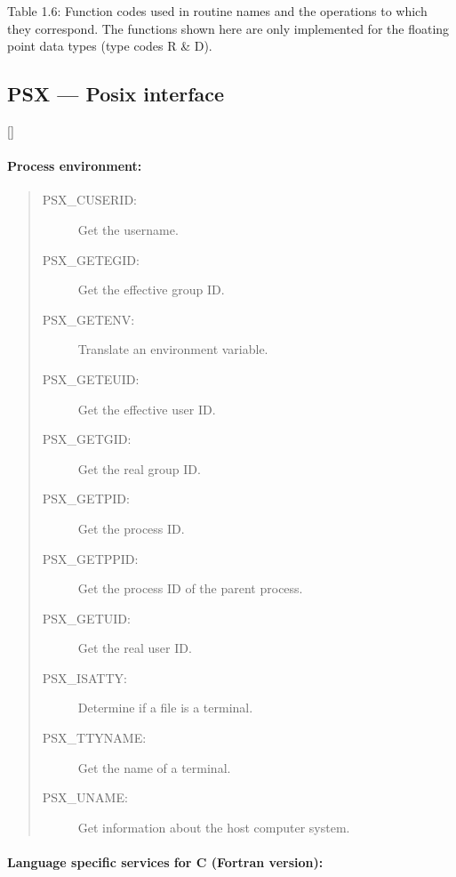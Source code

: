Table 1.6: Function codes used in routine names and the operations to which they
correspond.
The functions shown here are only implemented for the floating point data types
(type codes R \& D).

\newpage

\subsection{PSX --- Posix interface}

\vspace{-9mm}

\hfill []

\vspace{2mm}

\paragraph{Process environment:} \hfill

\begin{quote}
\begin{description}
\item [PSX\_CUSERID:]  Get the username.
\item [PSX\_GETEGID:]  Get the effective group ID.
\item [PSX\_GETENV:]  Translate an environment variable.
\item [PSX\_GETEUID:]  Get the effective user ID.
\item [PSX\_GETGID:]  Get the real group ID.
\item [PSX\_GETPID:]  Get the process ID.
\item [PSX\_GETPPID:]  Get the process ID of the parent process.
\item [PSX\_GETUID:]  Get the real user ID.
\item [PSX\_ISATTY:]  Determine if a file is a terminal.
\item [PSX\_TTYNAME:]  Get the name of a terminal.
\item [PSX\_UNAME:]  Get information about the host computer system.
\end{description}
\end{quote}

\vspace{10mm}

\paragraph{Language specific services for C (Fortran version):}

